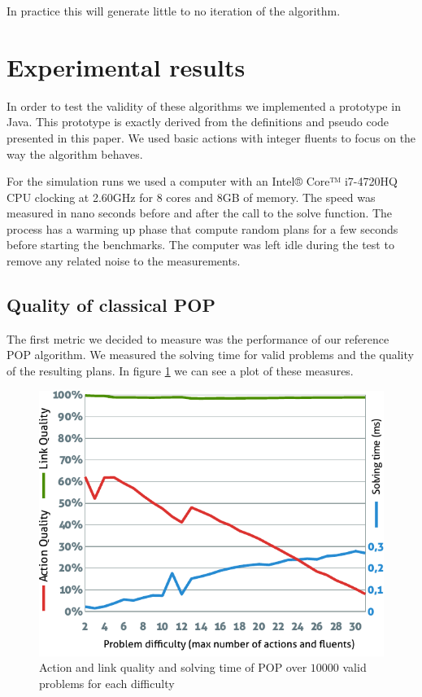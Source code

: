 \documentclass[]{article}
\begin{document}
In practice this will generate little to no iteration of the algorithm.

\section{Experimental results}\label{experimental-results}

In order to test the validity of these algorithms we implemented a
prototype in Java. This prototype is exactly derived from the
definitions and pseudo code presented in this paper. We used basic
actions with integer fluents to focus on the way the algorithm behaves.

For the simulation runs we used a computer with an Intel® Core™
i7-4720HQ CPU clocking at 2.60GHz for 8 cores and 8GB of memory. The
speed was measured in nano seconds before and after the call to the
solve function. The process has a warming up phase that compute random
plans for a few seconds before starting the benchmarks. The computer was
left idle during the test to remove any related noise to the
measurements.

\subsection{Quality of classical POP}\label{quality-of-classical-pop}

The first metric we decided to measure was the performance of our
reference POP algorithm. We measured the solving time for valid problems
and the quality of the resulting plans. In figure \ref{fig:quality} we
can see a plot of these measures.

\begin{figure}[htbp]
\centering
\includegraphics{graphics/quality.pdf}
\caption{Action and link quality and solving time of POP over \(10 000\)
valid problems for each difficulty\label{fig:quality}}
\end{figure}
\end{document}
